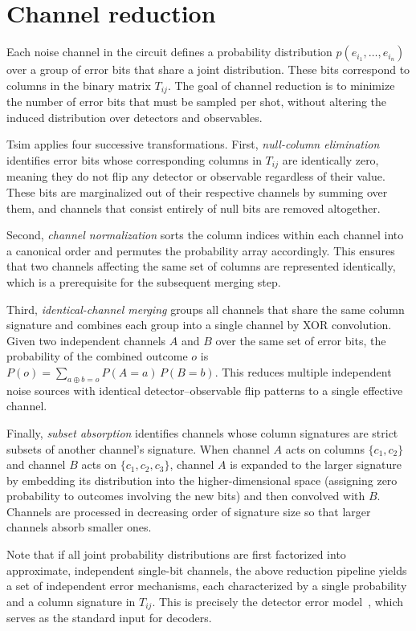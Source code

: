\documentclass[
  a4paper,
  onecolumn,
  11pt,
  allowtoday
]{quantumarticle}
\begin{document}
\section{Channel reduction}
\label{sec:channel_reduction}

Each noise channel in the circuit defines a probability distribution $p(e_{i_1},\dots,e_{i_n})$ over a group of error bits that share a joint distribution. These bits correspond to columns in the binary matrix $T_{ij}$. The goal of channel reduction is to minimize the number of error bits that must be sampled per shot, without altering the induced distribution over detectors and observables.

Tsim applies four successive transformations. First, \emph{null-column elimination} identifies error bits whose corresponding columns in $T_{ij}$ are identically zero, meaning they do not flip any detector or observable regardless of their value. These bits are marginalized out of their respective channels by summing over them, and channels that consist entirely of null bits are removed altogether.

Second, \emph{channel normalization} sorts the column indices within each channel into a canonical order and permutes the probability array accordingly. This ensures that two channels affecting the same set of columns are represented identically, which is a prerequisite for the subsequent merging step.

Third, \emph{identical-channel merging} groups all channels that share the same column signature and combines each group into a single channel by XOR convolution. Given two independent channels $A$ and $B$ over the same set of error bits, the probability of the combined outcome $o$ is $P(o) = \sum_{a \oplus b = o} P(A{=}a)\,P(B{=}b)$. This reduces multiple independent noise sources with identical detector--observable flip patterns to a single effective channel.

Finally, \emph{subset absorption} identifies channels whose column signatures are strict subsets of another channel's signature. When channel $A$ acts on columns $\{c_1, c_2\}$ and channel $B$ acts on $\{c_1, c_2, c_3\}$, channel $A$ is expanded to the larger signature by embedding its distribution into the higher-dimensional space (assigning zero probability to outcomes involving the new bits) and then convolved with $B$. Channels are processed in decreasing order of signature size so that larger channels absorb smaller ones.

Note that if all joint probability distributions are first factorized into approximate, independent single-bit channels, the above reduction pipeline yields a set of independent error mechanisms, each characterized by a single probability and a column signature in $T_{ij}$. This is precisely the detector error model~\cite{gidney2021stim}, which serves as the standard input for decoders.
\end{document}
